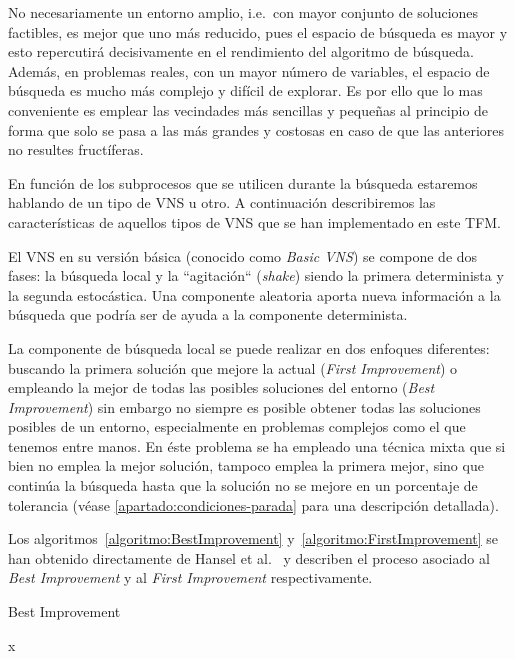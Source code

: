 No necesariamente un entorno amplio, i.e.\ con mayor conjunto de soluciones factibles, es mejor que uno más reducido, pues el espacio de búsqueda es mayor y esto repercutirá decisivamente en el rendimiento del algoritmo de búsqueda. Además, en problemas reales, con un mayor número de variables, el espacio de búsqueda es mucho más complejo y difícil de explorar. Es por ello que lo mas conveniente es emplear las vecindades más sencillas y pequeñas al principio de forma que solo se pasa a las más grandes y costosas en caso de que las anteriores no resultes fructíferas.

En función de los subprocesos que se utilicen durante la búsqueda estaremos hablando de un tipo de VNS u otro. A continuación describiremos las características de aquellos tipos de VNS que se han implementado en este TFM.

El VNS en su versión básica (conocido como \textit{Basic VNS}) se compone de dos fases: la búsqueda local y la ``agitación`` (\textit{shake}) siendo la primera determinista y la segunda estocástica. Una componente aleatoria aporta nueva información a la búsqueda que podría ser de ayuda a la componente determinista.

La componente de búsqueda local se puede realizar en dos enfoques diferentes: buscando la primera solución que mejore la actual (\textit{First Improvement}) o empleando la mejor de todas las posibles soluciones del entorno (\textit{Best Improvement}) sin embargo no siempre es posible obtener todas las soluciones posibles de un entorno, especialmente en problemas complejos como el que tenemos entre manos. En éste problema se ha empleado una técnica mixta que si bien no emplea la mejor solución, tampoco emplea la primera mejor, sino que continúa la búsqueda hasta que la solución no se mejore en un porcentaje de tolerancia (véase \autoref{apartado:condiciones-parada} para una descripción detallada).

Los algoritmos~\ref{algoritmo:BestImprovement} y~\ref{algoritmo:FirstImprovement} se han obtenido directamente de Hansel et al.~\cite{vns} y describen el proceso asociado al \textit{Best Improvement} y al \textit{First Improvement} respectivamente.

\begin{algorithm}[htbp]
\caption{Best Improvement}
\label{algoritmo:BestImprovement}

\DontPrintSemicolon
{}
\medskip

\Return x \;

\end{algorithm}

